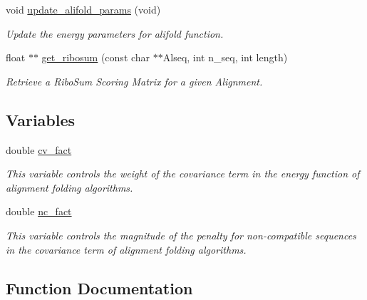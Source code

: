 \begin{DoxyCompactItemize}
void \hyperlink{group__consensus__fold_gac484c6bd429bafbd353b91044508d8e9}{update\+\_\+alifold\+\_\+params} (void)
\begin{DoxyCompactList}\small\item\em Update the energy parameters for alifold function. \end{DoxyCompactList}\item 
\mbox{\label{group__consensus__fold_ga1116aed4b2dab5252cd23946d47d52c3}} 
float $\ast$$\ast$ \hyperlink{group__consensus__fold_ga1116aed4b2dab5252cd23946d47d52c3}{get\+\_\+ribosum} (const char $\ast$$\ast$Alseq, int n\+\_\+seq, int length)
\begin{DoxyCompactList}\small\item\em Retrieve a Ribo\+Sum Scoring Matrix for a given Alignment. \end{DoxyCompactList}\end{DoxyCompactItemize}
\subsection*{Variables}
\begin{DoxyCompactItemize}
\item 
double \hyperlink{group__consensus__fold_gaf3cbac6ff5d706d6e414677841ddf94c}{cv\+\_\+fact}
\begin{DoxyCompactList}\small\item\em This variable controls the weight of the covariance term in the energy function of alignment folding algorithms. \end{DoxyCompactList}\item 
double \hyperlink{group__consensus__fold_ga502948a122a2af5b914355b1f3ea2f61}{nc\+\_\+fact}
\begin{DoxyCompactList}\small\item\em This variable controls the magnitude of the penalty for non-\/compatible sequences in the covariance term of alignment folding algorithms. \end{DoxyCompactList}\end{DoxyCompactItemize}


\subsection{Function Documentation}
\mbox{\label{group__consensus__fold_ga1c48869c03b49a342bf4cbdd61900081}} 
